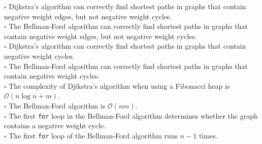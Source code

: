 \documentclass[12pt]{exam}
\begin{document}
\begin{questions}
\begin{parts}
        $\square$ Dijkstra's algorithm can correctly find shortest paths in graphs that contain negative weight edges, but not negative weight cycles. \\
        $\square$ The Bellman-Ford algorithm can correctly find shortest paths in graphs that contain negative weight edges, but not negative weight cycles. \\
        $\square$ Dijkstra's algorithm can correctly find shortest paths in graphs that contain negative weight cycles. \\
        $\square$ The Bellman-Ford algorithm can correctly find shortest paths in graphs that contain negative weight cycles. \\
        $\square$ The complexity of Djikstra's algorithm when using a Fibonacci heap is $\mathcal{O}(n\log n+m)$. \\
        $\square$ The Bellman-Ford algorithm is $\mathcal{O}(nm)$. \\
        $\square$ The first \texttt{for} loop in the Bellman-Ford algorithm determines whether the graph contains a negative weight cycle.\\
        $\square$ The first \texttt{for} loop of the Bellman-Ford algorithm runs $n-1$ times.

    \end{parts}

\end{questions}
\end{document}
